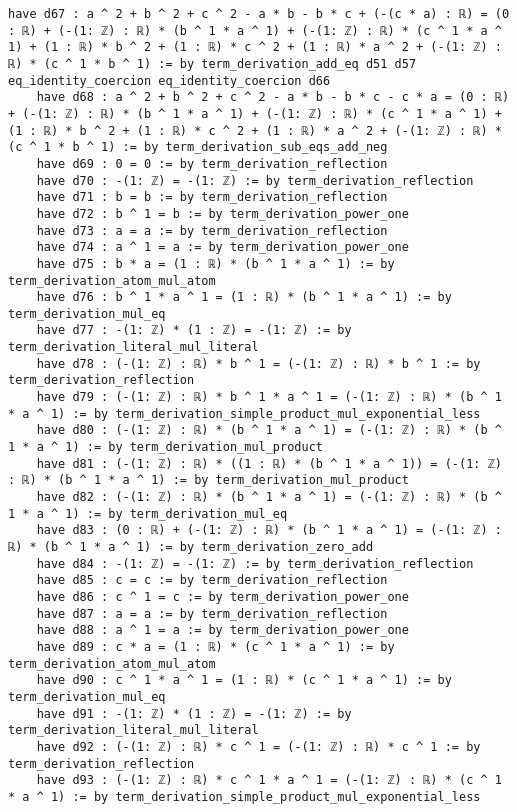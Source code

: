 \documentclass{article}
\begin{document}
\begin{tcolorbox}[colback=white!10, width=\linewidth]
\begin{lstlisting}[language=Lean4]
    have d67 : a ^ 2 + b ^ 2 + c ^ 2 - a * b - b * c + (-(c * a) : ℝ) = (0 : ℝ) + (-(1: ℤ) : ℝ) * (b ^ 1 * a ^ 1) + (-(1: ℤ) : ℝ) * (c ^ 1 * a ^ 1) + (1 : ℝ) * b ^ 2 + (1 : ℝ) * c ^ 2 + (1 : ℝ) * a ^ 2 + (-(1: ℤ) : ℝ) * (c ^ 1 * b ^ 1) := by term_derivation_add_eq d51 d57 eq_identity_coercion eq_identity_coercion d66
    have d68 : a ^ 2 + b ^ 2 + c ^ 2 - a * b - b * c - c * a = (0 : ℝ) + (-(1: ℤ) : ℝ) * (b ^ 1 * a ^ 1) + (-(1: ℤ) : ℝ) * (c ^ 1 * a ^ 1) + (1 : ℝ) * b ^ 2 + (1 : ℝ) * c ^ 2 + (1 : ℝ) * a ^ 2 + (-(1: ℤ) : ℝ) * (c ^ 1 * b ^ 1) := by term_derivation_sub_eqs_add_neg
    have d69 : 0 = 0 := by term_derivation_reflection
    have d70 : -(1: ℤ) = -(1: ℤ) := by term_derivation_reflection
    have d71 : b = b := by term_derivation_reflection
    have d72 : b ^ 1 = b := by term_derivation_power_one
    have d73 : a = a := by term_derivation_reflection
    have d74 : a ^ 1 = a := by term_derivation_power_one
    have d75 : b * a = (1 : ℝ) * (b ^ 1 * a ^ 1) := by term_derivation_atom_mul_atom
    have d76 : b ^ 1 * a ^ 1 = (1 : ℝ) * (b ^ 1 * a ^ 1) := by term_derivation_mul_eq
    have d77 : -(1: ℤ) * (1 : ℤ) = -(1: ℤ) := by term_derivation_literal_mul_literal
    have d78 : (-(1: ℤ) : ℝ) * b ^ 1 = (-(1: ℤ) : ℝ) * b ^ 1 := by term_derivation_reflection
    have d79 : (-(1: ℤ) : ℝ) * b ^ 1 * a ^ 1 = (-(1: ℤ) : ℝ) * (b ^ 1 * a ^ 1) := by term_derivation_simple_product_mul_exponential_less
    have d80 : (-(1: ℤ) : ℝ) * (b ^ 1 * a ^ 1) = (-(1: ℤ) : ℝ) * (b ^ 1 * a ^ 1) := by term_derivation_mul_product
    have d81 : (-(1: ℤ) : ℝ) * ((1 : ℝ) * (b ^ 1 * a ^ 1)) = (-(1: ℤ) : ℝ) * (b ^ 1 * a ^ 1) := by term_derivation_mul_product
    have d82 : (-(1: ℤ) : ℝ) * (b ^ 1 * a ^ 1) = (-(1: ℤ) : ℝ) * (b ^ 1 * a ^ 1) := by term_derivation_mul_eq
    have d83 : (0 : ℝ) + (-(1: ℤ) : ℝ) * (b ^ 1 * a ^ 1) = (-(1: ℤ) : ℝ) * (b ^ 1 * a ^ 1) := by term_derivation_zero_add
    have d84 : -(1: ℤ) = -(1: ℤ) := by term_derivation_reflection
    have d85 : c = c := by term_derivation_reflection
    have d86 : c ^ 1 = c := by term_derivation_power_one
    have d87 : a = a := by term_derivation_reflection
    have d88 : a ^ 1 = a := by term_derivation_power_one
    have d89 : c * a = (1 : ℝ) * (c ^ 1 * a ^ 1) := by term_derivation_atom_mul_atom
    have d90 : c ^ 1 * a ^ 1 = (1 : ℝ) * (c ^ 1 * a ^ 1) := by term_derivation_mul_eq
    have d91 : -(1: ℤ) * (1 : ℤ) = -(1: ℤ) := by term_derivation_literal_mul_literal
    have d92 : (-(1: ℤ) : ℝ) * c ^ 1 = (-(1: ℤ) : ℝ) * c ^ 1 := by term_derivation_reflection
    have d93 : (-(1: ℤ) : ℝ) * c ^ 1 * a ^ 1 = (-(1: ℤ) : ℝ) * (c ^ 1 * a ^ 1) := by term_derivation_simple_product_mul_exponential_less

\end{lstlisting}
\end{tcolorbox}
\end{document}
